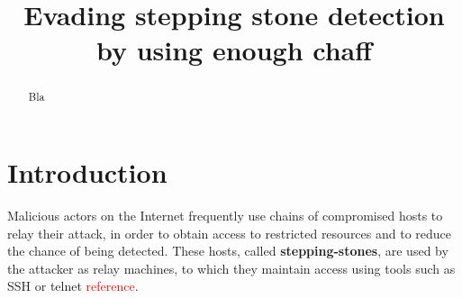 \documentclass[conference]{IEEEtran}\usepackage[]{graphicx}\usepackage[]{color}
\begin{document}
\title{Evading stepping stone detection by using enough chaff}


\author{
\and
{}
\and
{}
}


\IEEEoverridecommandlockouts
\makeatletter{}\makeatother
{}


\maketitle          

\begin{abstract}

Bla
\end{abstract}



\section{Introduction}



Malicious actors on the Internet frequently use chains of compromised hosts to relay their attack, in order to obtain access to restricted resources and to reduce the chance of being detected. These hosts, called \textbf{stepping-stones}, are used by the attacker as relay machines, to which they maintain access using tools such as SSH or telnet \textcolor{red}{reference}. 
\end{document}
